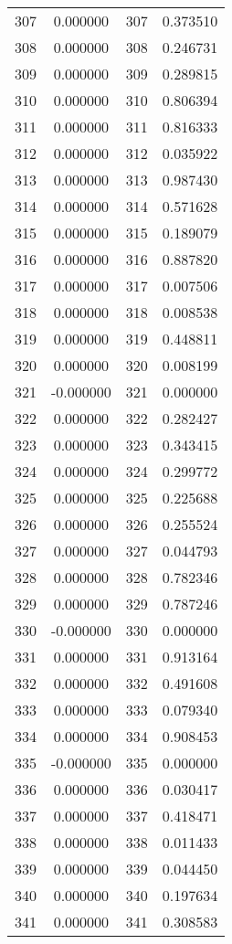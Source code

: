 \documentclass[12pt]{article}
\begin{document}
\begin{longtable}{@{}cccc@{}}
307 & 0.000000 & 307 & 0.373510 \\
308 & 0.000000 & 308 & 0.246731 \\
309 & 0.000000 & 309 & 0.289815 \\
310 & 0.000000 & 310 & 0.806394 \\
311 & 0.000000 & 311 & 0.816333 \\
312 & 0.000000 & 312 & 0.035922 \\
313 & 0.000000 & 313 & 0.987430 \\
314 & 0.000000 & 314 & 0.571628 \\
315 & 0.000000 & 315 & 0.189079 \\
316 & 0.000000 & 316 & 0.887820 \\
317 & 0.000000 & 317 & 0.007506 \\
318 & 0.000000 & 318 & 0.008538 \\
319 & 0.000000 & 319 & 0.448811 \\
320 & 0.000000 & 320 & 0.008199 \\
321 & -0.000000 & 321 & 0.000000 \\
322 & 0.000000 & 322 & 0.282427 \\
323 & 0.000000 & 323 & 0.343415 \\
324 & 0.000000 & 324 & 0.299772 \\
325 & 0.000000 & 325 & 0.225688 \\
326 & 0.000000 & 326 & 0.255524 \\
327 & 0.000000 & 327 & 0.044793 \\
328 & 0.000000 & 328 & 0.782346 \\
329 & 0.000000 & 329 & 0.787246 \\
330 & -0.000000 & 330 & 0.000000 \\
331 & 0.000000 & 331 & 0.913164 \\
332 & 0.000000 & 332 & 0.491608 \\
333 & 0.000000 & 333 & 0.079340 \\
334 & 0.000000 & 334 & 0.908453 \\
335 & -0.000000 & 335 & 0.000000 \\
336 & 0.000000 & 336 & 0.030417 \\
337 & 0.000000 & 337 & 0.418471 \\
338 & 0.000000 & 338 & 0.011433 \\
339 & 0.000000 & 339 & 0.044450 \\
340 & 0.000000 & 340 & 0.197634 \\
341 & 0.000000 & 341 & 0.308583 \\

\end{longtable}
\end{document}
